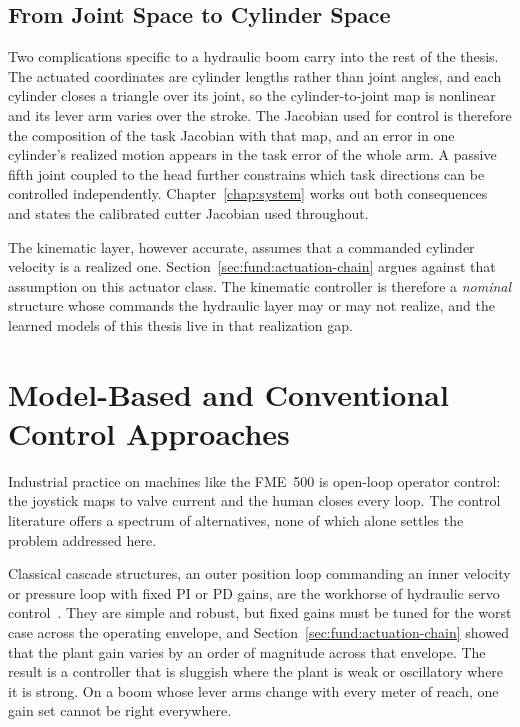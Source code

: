 \subsection{From Joint Space to Cylinder Space}

Two complications specific to a hydraulic boom carry into the rest of the
thesis. The actuated coordinates are cylinder lengths rather than joint
angles, and each cylinder closes a triangle over its joint, so the
cylinder-to-joint map is nonlinear and its lever arm varies over the
stroke. The Jacobian used for control is therefore the composition of the
task Jacobian with that map, and an error in one cylinder's realized
motion appears in the task error of the whole arm. A passive fifth joint
coupled to the head further constrains which task directions can be
controlled independently. Chapter~\ref{chap:system} works out both
consequences and states the calibrated cutter Jacobian used throughout.

The kinematic layer, however accurate, assumes that a commanded cylinder
velocity is a realized one. Section~\ref{sec:fund:actuation-chain} argues
against that assumption on this actuator class. The kinematic controller
is therefore a \emph{nominal} structure whose commands the hydraulic
layer may or may not realize, and the learned models of this thesis live
in that realization gap.

\section{Model-Based and Conventional Control Approaches}
\label{sec:fund:conventional-control}

Industrial practice on machines like the FME~500 is open-loop operator
control: the joystick maps to valve current and the human closes every
loop. The control literature offers a spectrum of alternatives, none of which
alone settles the problem addressed here.

Classical cascade structures, an outer position loop commanding an inner
velocity or pressure loop with fixed PI or PD gains, are the workhorse of
hydraulic servo control~\cite{jelali2003hydraulic}. They are simple and
robust, but fixed gains must be tuned for the worst case across the
operating envelope, and Section~\ref{sec:fund:actuation-chain} showed
that the plant gain varies by an order of magnitude across that
envelope. The result is a controller that is sluggish where the plant is
weak or oscillatory where it is strong. On a boom whose lever arms change
with every meter of reach, one gain set cannot be right everywhere.

